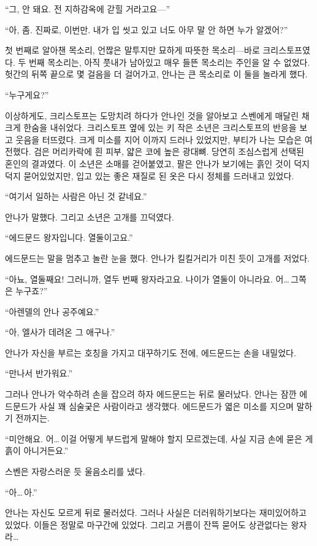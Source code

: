 ``그, 안 돼요. 전 지하감옥에 갇힐 거라고요—''

``아, 좀. 진짜로, 이번만. 내가 입 씻고 있고 너도 아무 말 안 하면 누가 알겠어?''

첫 번째로 알아챈 목소리, 언짢은 말투지만 묘하게 따뜻한 목소리—바로 크리스토프였다. 두 번째 목소리는, 아직 풋내가 남아있고 매우 들뜬 목소리는 주인을 알 수 없었다. 헛간의 뒤쪽 끝으로 몇 걸음을 더 걸어가고, 안나는 큰 목소리로 이 둘을 놀라게 했다.

``누구게요?''

이상하게도, 크리스토프는 도망치려 하다가 안나인 것을 알아보고 스벤에게 매달린 채 크게 한숨을 내쉬었다. 크리스토프 옆에 있는 키 작은 소년은 크리스토프의 반응을 보고 웃음을 터뜨렸다. 크게 미소를 지어 이까지 드러나 있었지만, 부티가 나는 모습은 여전했다. 검은 머리카락에 흰 피부, 얇은 코에 높은 광대뼈. 당연히 조심스럽게 선택된 혼인의 결과였다. 이 소년은 소매를 걷어붙였고, 팔은 안나가 보기에는 흙인 것이 덕지덕지 묻어있었지만, 입고 있는 좋은 재질로 된 옷은 다시 정체를 드러내고 있었다.

``여기서 일하는 사람은 아닌 것 같네요.''

안나가 말했다. 그리고 소년은 고개를 끄덕였다.

``에드문드 왕자입니다. 열둘이고요.''

에드문드는 말을 멈추고 놀란 눈을 했다. 안나가 킬킬거리가 미친 듯이 고개를 저었다.

``아뇨, 열둘째요! 그러니까, 열두 번째 왕자라고요. 나이가 열둘이 아니라요. 어\ldots\,그쪽은 누구죠?''

``아렌델의 안나 공주예요.''

``아, 엘사가 데려온 그 애구나.''

안나가 자신을 부르는 호칭을 가지고 대꾸하기도 전에, 에드문드는 손을 내밀었다.

``만나서 반가워요.''

그러나 안나가 악수하려 손을 잡으려 하자 에드문드는 뒤로 물러났다. 안나는 잠깐 에드문드가 사실 꽤 심술궂은 사람이라고 생각했다. 에드문드가 엷은 미소를 지으며 말하기 전까지는.

``미안해요. 어\ldots\,이걸 어떻게 부드럽게 말해야 할지 모르겠는데, 사실 지금 손에 묻은 게 흙이 아니거든요.''

스벤은 자랑스러운 듯 울음소리를 냈다.

``아\ldots\,아.''

안나는 자신도 모르게 뒤로 물러섰다. 그러나 사실은 더러워하기보다는 재미있어하고 있었다. 이들은 정말로 마구간에 있었다. 그리고 거름이 잔뜩 묻어도 상관없다는 왕자라\ldots

